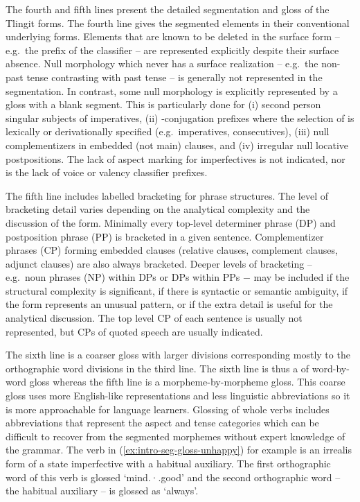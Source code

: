 The fourth and fifth lines present the detailed segmentation and gloss of the Tlingit forms.
The fourth line gives the segmented elements in their conventional underlying forms.
Elements that are known to be deleted in the surface form – e.g.\ the  prefix of the classifier – are represented explicitly despite their surface absence.
Null morphology which never has a surface realization – e.g.\ the non-past tense contrasting with past tense  – is generally not represented in the segmentation.
In contrast, some null morphology is explicitly represented by a gloss with a blank segment.
This is particularly done for (i) second person singular subjects of imperatives, (ii) -conjugation prefixes where the selection of  is lexically or derivationally specified (e.g.\ imperatives, consecutives), (iii) null complementizers in embedded (not main) clauses, and (iv) irregular null locative postpositions.
The lack of aspect marking for imperfectives is not indicated, nor is the lack of voice or valency classifier prefixes.


The fifth line includes labelled bracketing for phrase structures.
The level of bracketing detail varies depending on the analytical complexity and the discussion of the form.
Minimally every top-level determiner phrase (DP) and postposition phrase (PP) is bracketed in a given sentence.
Complementizer phrases (CP) forming embedded clauses (relative clauses, complement clauses, adjunct clauses) are also always bracketed.
Deeper levels of bracketing – e.g.\ noun phrases (NP) within DPs or DPs within PPs − may be included if the structural complexity is significant, if there is syntactic or semantic ambiguity, if the form represents an unusual pattern, or if the extra detail is useful for the analytical discussion.
The top level CP of each sentence is usually not represented, but CPs of quoted speech are usually indicated.

The sixth line is a coarser gloss with larger divisions corresponding mostly to the orthographic word divisions in the third line.
The sixth line is thus a of word-by-word gloss whereas the fifth line is a morpheme-by-morpheme gloss.
This coarse gloss uses more English-like representations and less linguistic abbreviations so it is more approachable for language learners.
Glossing of whole verbs includes abbreviations that represent the aspect and tense categories which can be difficult to recover from the segmented morphemes without expert knowledge of the grammar.
The verb in (\ref{ex:intro-seg-gloss-unhappy}) for example is an irrealis form of a state imperfective with a habitual auxiliary.
The first orthographic word of this verb is glossed ‘mind.·.good’ and the second orthographic word – the habitual auxiliary – is glossed as ‘always’.

